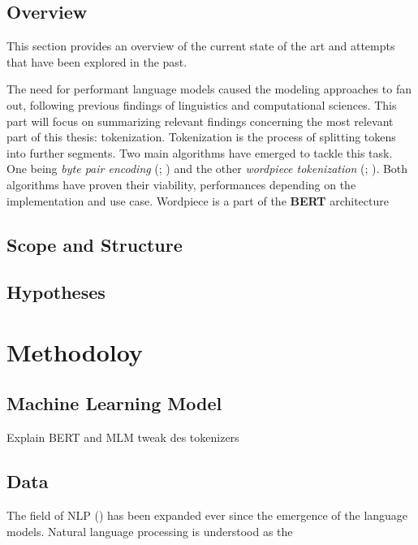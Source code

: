 \documentclass[english]{ttlab-qualify}
\begin{document}
    \section{Overview}
    This section provides an overview of the current state of the art and attempts that have been explored in the past.

    The need for performant language models caused the modeling approaches to fan out, following previous findings of linguistics and computational sciences.
    This part will focus on summarizing relevant findings concerning the most relevant part of this thesis: tokenization.
    Tokenization is the process of splitting tokens into further segments.
    Two main algorithms have emerged to tackle this task.
    One being \textit{byte pair encoding} (\cite{BPE}; \cite{BPEGAGE}) and the other \textit{wordpiece tokenization} (\cite{WORDPIECEGOOGLE}; \cite{WORDPIECEOG}).
    Both algorithms have proven their viability, performances depending on the implementation and use case.
    Wordpiece is a part of the \textbf{BERT} architecture \cite{ATTENTION}

    \section{Scope and Structure}

    \section{Hypotheses}


    \chapter{Methodoloy}

    \section{Machine Learning Model}
    Explain BERT and MLM
    tweak des tokenizers
    \section{Data}



    



    The field of NLP  (\cite{METZLER2016}) has been expanded ever since the emergence of the language models.
    Natural language processing is understood as the
    \\
\end{document}
